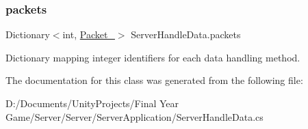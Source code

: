 \subsubsection{\texorpdfstring{packets}{packets}}
{\footnotesize\ttfamily Dictionary$<$int, \mbox{\hyperlink{class_server_handle_data_ae901e6592461e1e8403b0161e4a6c6a6}{Packet\+\_\+}}$>$ Server\+Handle\+Data.\+packets\hspace{0.3cm}{\ttfamily [private]}}



Dictionary mapping integer identifiers for each data handling method. 



The documentation for this class was generated from the following file\+:\begin{DoxyCompactItemize}
\item 
D\+:/\+Documents/\+Unity\+Projects/\+Final Year Game/\+Server/\+Server/\+Server\+Application/Server\+Handle\+Data.\+cs\end{DoxyCompactItemize}
